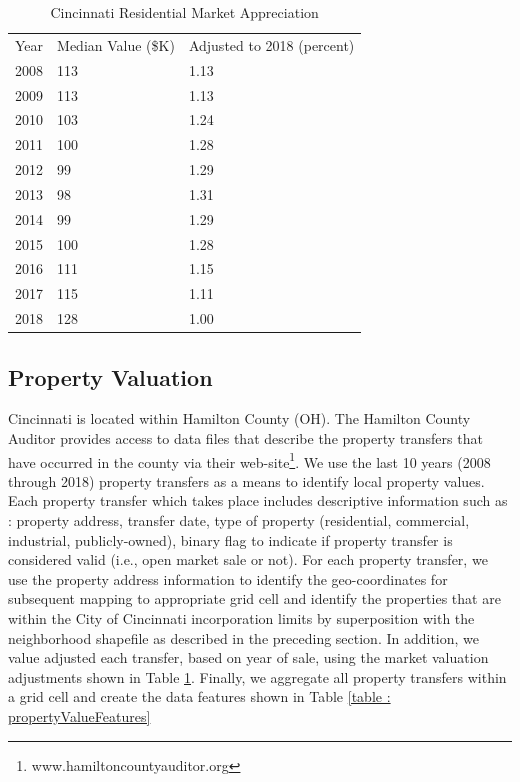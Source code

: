 \documentclass{llncs}
\begin{document}
\FloatBarrier
\begin{table}[!h]
\begin{center}
\caption{Cincinnati Residential Market Appreciation}
\label{table : marketappreciation}
\begin{tabular}{ p{}  p{}  p{}}
\hline
\rule{0pt}{12pt}
Year	&	Median Value (\$K)	&	Adjusted to 2018 (percent)	\\
2008	&	113	&	1.13	\\
2009	&	113	&	1.13	\\
2010	&	103	&	1.24	\\
2011	&	100	&	1.28	\\
2012	&	99	&	1.29	\\
2013	&	98	&	1.31	\\
2014	&	99	&	1.29	\\
2015	&	100	&	1.28	\\
2016	&	111	&	1.15	\\
2017	&	115	&	1.11	\\
2018	&	128	&	1.00	\\[2pt]
\hline
\end{tabular}
\end{center}
\end{table}
\FloatBarrier
%


\subsection{Property Valuation}

Cincinnati is located within Hamilton County (OH). The Hamilton County Auditor provides access to data files that describe the property transfers that have occurred in the county via their web-site\footnote{\label{hcauditor}www.hamiltoncountyauditor.org}. We use the last 10 years (2008 through 2018) property transfers as a means to identify local property values. Each property transfer which takes place includes descriptive information such as : property address, transfer date, type of property (residential, commercial, industrial, publicly-owned), binary flag to indicate if property transfer is considered valid (i.e., open market sale or not). For each property transfer, we use the property address information to identify the geo-coordinates for subsequent mapping to appropriate grid cell and identify the properties that are within the City of Cincinnati incorporation limits by superposition with the neighborhood shapefile as described in the preceding section. In addition, we value adjusted each transfer, based on year of sale, using the market valuation adjustments shown in Table  \ref{table : marketappreciation}. Finally, we aggregate all property transfers within a grid cell and create the data features shown in Table \ref{table : propertyValueFeatures} 
\end{document}
